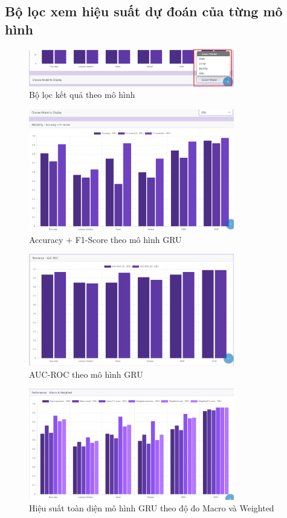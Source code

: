 \subsection{Bộ lọc xem hiệu suất dự đoán của từng mô hình}
\begin{figure}[H]
    \centering
    \includegraphics[width = 0.8\textwidth]{imgs/demo-13.png}
    \caption{Bộ lọc kết quả theo mô hình}
    \label{fig:demo-13}
\end{figure}
\begin{figure}[H]
    \centering
    \includegraphics[width = 0.8\textwidth]{imgs/demo-14.png}
    \caption{Accuracy + F1-Score theo mô hình GRU}
    \label{fig:demo-14}
\end{figure}
\begin{figure}[H]
    \centering
    \includegraphics[width = 0.8\textwidth]{imgs/demo-15.png}
    \caption{AUC-ROC theo mô hình GRU}
    \label{fig:demo-15}
\end{figure}
\begin{figure}[H]
    \centering
    \includegraphics[width = 0.8\textwidth]{imgs/demo-16.png}
    \caption{Hiệu suất toàn diện mô hình GRU theo độ đo Macro và Weighted}
    \label{fig:demo-16}
\end{figure}
